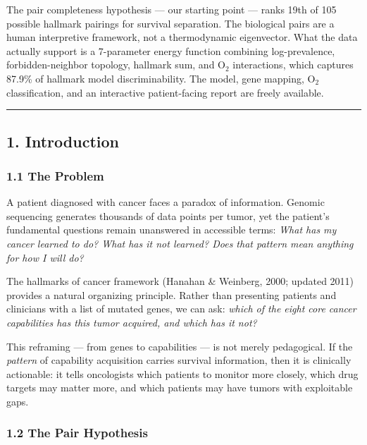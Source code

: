 \documentclass[
  11pt,
]{article}
\begin{document}
The pair completeness hypothesis --- our starting point --- ranks 19th
of 105 possible hallmark pairings for survival separation. The
biological pairs are a human interpretive framework, not a thermodynamic
eigenvector. What the data actually support is a 7-parameter energy
function combining log-prevalence, forbidden-neighbor topology, hallmark
sum, and O\(_2\) interactions, which captures 87.9\% of hallmark model
discriminability. The model, gene mapping, O\(_2\) classification, and
an interactive patient-facing report are freely available.

\begin{center}\rule{0.5\linewidth}{0.5pt}\end{center}

\subsection{1. Introduction}\label{introduction}

\subsubsection{1.1 The Problem}\label{the-problem}

A patient diagnosed with cancer faces a paradox of information. Genomic
sequencing generates thousands of data points per tumor, yet the
patient's fundamental questions remain unanswered in accessible terms:
\emph{What has my cancer learned to do? What has it not learned? Does
that pattern mean anything for how I will do?}

The hallmarks of cancer framework (Hanahan \& Weinberg, 2000; updated
2011) provides a natural organizing principle. Rather than presenting
patients and clinicians with a list of mutated genes, we can ask:
\emph{which of the eight core cancer capabilities has this tumor
acquired, and which has it not?}

This reframing --- from genes to capabilities --- is not merely
pedagogical. If the \emph{pattern} of capability acquisition carries
survival information, then it is clinically actionable: it tells
oncologists which patients to monitor more closely, which drug targets
may matter more, and which patients may have tumors with exploitable
gaps.

\subsubsection{1.2 The Pair Hypothesis}\label{the-pair-hypothesis}
\end{document}
